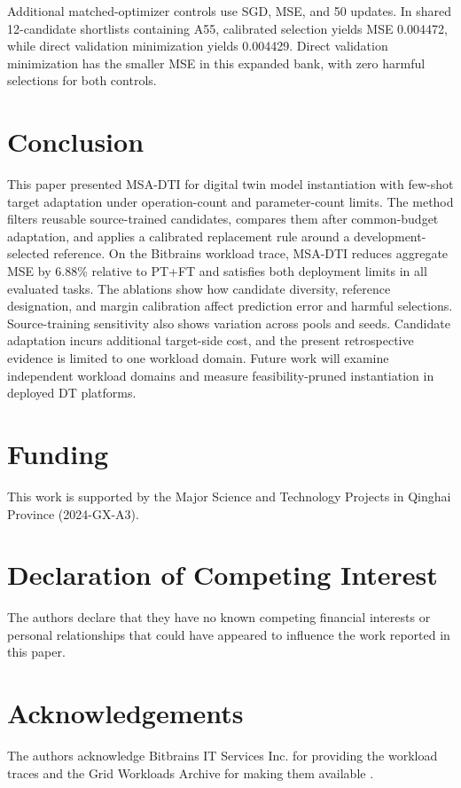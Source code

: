 \documentclass[a4paper,fleqn]{cas-sc}
\begin{document}
Additional matched-optimizer controls use SGD, MSE, and 50 updates. In
shared 12-candidate shortlists containing A55, calibrated selection yields MSE 0.004472,
while direct validation minimization yields 0.004429. Direct validation
minimization has the smaller MSE in this expanded bank, with zero harmful
selections for both controls.

\section{Conclusion}
\label{sec:conclusion}
This paper presented MSA-DTI for digital twin model instantiation with
few-shot target adaptation under operation-count and parameter-count limits.
The method filters reusable source-trained candidates, compares them after
common-budget adaptation, and applies a calibrated replacement rule around
a development-selected reference. On the Bitbrains workload trace,
MSA-DTI reduces aggregate MSE by 6.88\% relative to PT+FT and satisfies
both deployment limits in all evaluated tasks. The ablations show how
candidate diversity, reference designation, and margin calibration affect
prediction error and harmful selections. Source-training sensitivity also
shows variation across pools and seeds. Candidate adaptation incurs
additional target-side cost, and the present retrospective evidence is
limited to one workload domain. Future work will examine independent
workload domains and measure feasibility-pruned instantiation in deployed
DT platforms.


\section*{Funding}
This work is supported by the Major Science and Technology Projects in Qinghai
Province (2024-GX-A3).

\section*{Declaration of Competing Interest}
The authors declare that they have no known competing financial interests
or personal relationships that could have appeared to influence the work
reported in this paper.

\section*{Acknowledgements}
The authors acknowledge Bitbrains IT Services Inc. for providing the workload
traces and the Grid Workloads Archive for making them available
\cite{refBitbrains,refGWA}.
\end{document}
